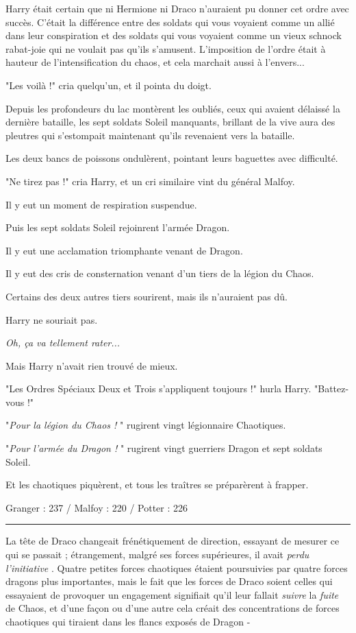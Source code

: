 Harry était certain que ni Hermione ni Draco n'auraient pu donner cet ordre avec succès. C'était la différence entre des soldats qui vous voyaient comme un allié dans leur conspiration et des soldats qui vous voyaient comme un vieux schnock rabat-joie qui ne voulait pas qu'ils s'amusent. L'imposition de l'ordre était à hauteur de l'intensification du chaos, et cela marchait aussi à l'envers...

"Les voilà !" cria quelqu'un, et il pointa du doigt.

Depuis les profondeurs du lac montèrent les oubliés, ceux qui avaient délaissé la dernière bataille, les sept soldats Soleil manquants, brillant de la vive aura des pleutres qui s'estompait maintenant qu'ils revenaient vers la bataille.

Les deux bancs de poissons ondulèrent, pointant leurs baguettes avec difficulté.

"Ne tirez pas !" cria Harry, et un cri similaire vint du général Malfoy.

Il y eut un moment de respiration suspendue.

Puis les sept soldats Soleil rejoinrent l'armée Dragon.

Il y eut une acclamation triomphante venant de Dragon.

Il y eut des cris de consternation venant d'un tiers de la légion du Chaos.

Certains des deux autres tiers sourirent, mais ils n'auraient pas dû.

Harry ne souriait pas.

\emph{Oh, ça va tellement rater...} 

Mais Harry n'avait rien trouvé de mieux.

"Les Ordres Spéciaux Deux et Trois s'appliquent toujours !" hurla Harry. "Battez-vous !"

"\emph{Pour la légion du Chaos !} " rugirent vingt légionnaire Chaotiques.

"\emph{Pour l'armée du Dragon !} " rugirent vingt guerriers Dragon et sept soldats Soleil.

Et les chaotiques piquèrent, et tous les traîtres se préparèrent à frapper.

Granger : 237 / Malfoy : 220 / Potter : 226
\par\noindent\rule{\textwidth}{0.4pt}
La tête de Draco changeait frénétiquement de direction, essayant de mesurer ce qui se passait ; étrangement, malgré ses forces supérieures, il avait \emph{perdu l'initiative} . Quatre petites forces chaotiques étaient poursuivies par quatre forces dragons plus importantes, mais le fait que les forces de Draco soient celles qui essayaient de provoquer un engagement signifiait qu'il leur fallait \emph{suivre}  la \emph{fuite}  de Chaos, et d'une façon ou d'une autre cela créait des concentrations de forces chaotiques qui tiraient dans les flancs exposés de Dragon -

